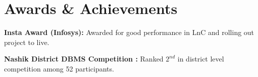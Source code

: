 \documentclass[letterpaper,11pt]{article}
\newcommand{\resumeSubHeadingListStart}{\begin{itemize}[leftmargin=0.15in, label={}]}
\newcommand{\resumeSubHeadingListEnd}{\end{itemize}}
\begin{document}
\section{Awards \& Achievements}
  \vspace{2pt}
  \resumeSubHeadingListStart
    \small{\item{
        \textbf{Insta Award (Infosys):}{ Awarded for good performance in LnC and rolling out project to live.} \\ \vspace{3pt}
    
        
        \textbf{Nashik District DBMS Competition :}{ Ranked $2^{nd}$ in district level competition among 52 participants.} \\ \vspace{3pt}
        
        
        
        
    }}
  \resumeSubHeadingListEnd



        
\end{document}
